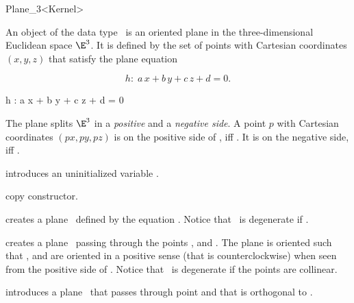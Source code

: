 \begin{ccRefClass} {Plane_3<Kernel>}

\ccDefinition 
An object  of the data type \ccRefName\ is an oriented
plane in the three-dimensional Euclidean space $\E^3$. It is defined
by the set of points with Cartesian coordinates $(x,y,z)$ that satisfy
the plane equation

\begin{ccTexOnly}
\[h :\;  a\, x +b\, y +c\, z + d = 0.\]
\end{ccTexOnly}
\begin{ccHtmlOnly}
h : a x + b y + c z + d = 0
\end{ccHtmlOnly}

The plane splits $\E^3$ in a {\em positive} and a {\em negative side}.
A point $p$ with Cartesian coordinates $(px, py, pz)$ is on the
positive side of , iff . It is on the negative side, iff
.

\ccCreation
{}

\ccHidden {}
             {introduces an uninitialized variable \ccVar.}

\ccHidden {}
            {copy constructor.}

{creates a plane \ccVar\ defined by the equation
 .
Notice that \ccVar\ is degenerate if 
 .}

{creates a plane \ccVar\ passing through the points ,
  and . The plane is oriented such that , 
  and  are oriented in a positive sense 
 (that is counterclockwise) when seen from the positive side of \ccVar.
Notice that \ccVar\ is degenerate if the points are collinear.}


{introduces a plane \ccVar\ that passes through point  and
 that is orthogonal to .}


\end{ccRefClass}

